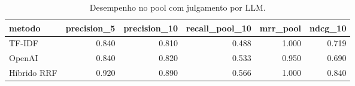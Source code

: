 \begin{table}
\caption{Desempenho no pool com julgamento por LLM.}
\label{tab:metricas-julgadas}
\begin{tabular}{lrrrrr}
\toprule
metodo & precision_5 & precision_10 & recall_pool_10 & mrr_pool & ndcg_10 \\
\midrule
TF-IDF & 0.840 & 0.810 & 0.488 & 1.000 & 0.719 \\
OpenAI & 0.840 & 0.820 & 0.533 & 0.950 & 0.690 \\
Híbrido RRF & 0.920 & 0.890 & 0.566 & 1.000 & 0.840 \\
\bottomrule
\end{tabular}
\end{table}
